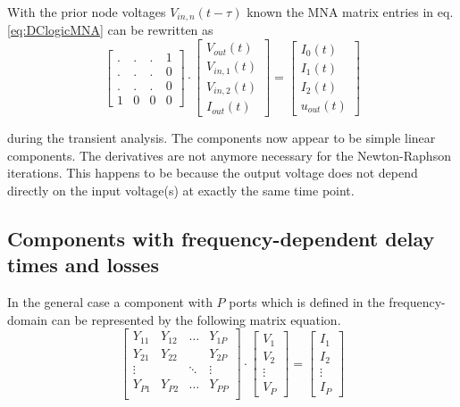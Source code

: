 With the prior node voltages $V_{in,n}\left(t - \tau\right)$ known the
MNA matrix entries in eq. \eqref{eq:DClogicMNA} can be rewritten as
\begin{equation}
\begin{bmatrix}
.&.&.& 1\\
.&.&.& 0\\
.&.&.& 0\\
1 & 0 & 0 & 0
\end{bmatrix}
\cdot
\begin{bmatrix}
V_{out}\left(t\right)\\
V_{in,1}\left(t\right)\\
V_{in,2}\left(t\right)\\
I_{out}\left(t\right)
\end{bmatrix}
=
\begin{bmatrix}
I_{0}\left(t\right)\\
I_{1}\left(t\right)\\
I_{2}\left(t\right)\\
u_{out}\left(t\right)
\end{bmatrix}
\end{equation}

during the transient analysis.  The components now appear to be simple
linear components.  The derivatives are not anymore necessary for the
Newton-Raphson iterations.  This happens to be because the output
voltage does not depend directly on the input voltage(s) at exactly
the same time point.

\subsection{Components with frequency-dependent delay times and losses}

In the general case a component with $P$ ports which is defined in the
frequency-domain can be represented by the following matrix equation.
\begin{equation}
\begin{bmatrix}
Y_{11} & Y_{12} & \ldots & Y_{1P}\\
Y_{21} & Y_{22} &  & Y_{2P}\\
\vdots &  & \ddots & \vdots\\
Y_{P1} & Y_{P2} & \ldots & Y_{PP}\\
\end{bmatrix}
\cdot
\begin{bmatrix}
V_{1}\\
V_{2}\\
\vdots\\
V_{P}
\end{bmatrix}
=
\begin{bmatrix}
I_{1}\\
I_{2}\\
\vdots\\
I_{P}
\end{bmatrix}
\end{equation}

